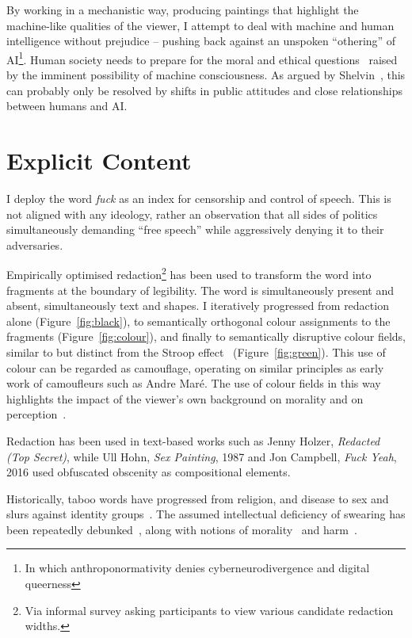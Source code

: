 \documentclass[12pt]{article}
\begin{document}
By working in a mechanistic way, producing paintings that highlight
the machine-like qualities of the viewer, I attempt to deal with
machine and human intelligence without prejudice -- pushing back
against an unspoken ``othering'' of AI\footnote{In which anthroponormativity denies cyberneurodivergence and digital queerness}. Human society needs to prepare
for the moral and ethical
questions~\cite{chalmers1996conscious,metzinger2009egotunnel,bostrom2014ethics}
raised by the imminent possibility of machine consciousness. As argued by
Shelvin~\cite{shevlin2023consciousness}, this can probably only be
resolved by shifts in public attitudes and close relationships between
humans and AI.

\section{Explicit Content}
I deploy the word \emph{fuck} as an index for censorship and control
of speech\cite{atkins2006censoring}. This is not aligned with any
ideology, rather an observation that all sides of politics
simultaneously demanding ``free speech'' while aggressively denying it
to their adversaries\cite{lukianoff2023cancelling}.

Empirically optimised redaction\footnote{Via informal survey asking
  participants to view various candidate redaction widths.} has been
used to transform the word into fragments at the boundary of
legibility. The word is simultaneously present and absent,
simultaneously text and shapes. I iteratively progressed from
redaction alone (Figure~\ref{fig:black}), to semantically orthogonal
colour assignments to the fragments (Figure~\ref{fig:colour}), and
finally to semantically disruptive colour fields, similar to but
distinct from the Stroop effect~\cite{stroop1935studies}
(Figure~\ref{fig:green}). This use of colour can be regarded as
camouflage, operating on similar principles as early work of
camoufleurs such as Andre Mar\'e.  The use of colour fields in this
way highlights the impact of the viewer's own background on morality
and on perception~\cite{kuhn1970structure,popper1972objective}.

Redaction has been used in text-based works such as Jenny Holzer,
\emph{Redacted (Top Secret)}, while Ull Hohn, \emph{Sex Painting},
1987 and Jon Campbell, \emph{Fuck Yeah}, 2016 used obfuscated obscenity
as compositional elements.

Historically, taboo words have progressed from religion, and disease
to sex and slurs against identity
groups~\cite{douglas1966purity,pinker2008seven,mcwhorter2024nine}. The
assumed intellectual deficiency of swearing has been repeatedly
debunked~\cite{reiman2022swearfluency,jay2015taboo}, along with
notions of morality~\cite{pinker2017moral,devries2023swearing} and
harm~\cite{jay2009offensive}.
\end{document}
